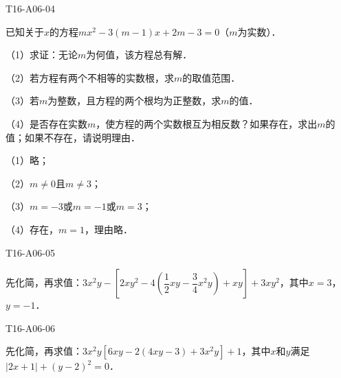 \begin{defproblem}{T16-A06-04}%
\begin{onlyproblem}%
已知关于$x$的方程$mx^{2}-3(m-1)x+2m-3=0$（$m$为实数）．

（1）求证：无论$m$为何值，该方程总有解．

（2）若方程有两个不相等的实数根，求$m$的取值范围．

（3）若$m$为整数，且方程的两个根均为正整数，求$m$的值．

（4）是否存在实数$m$，使方程的两个实数根互为相反数？如果存在，求出$m$的值；如果不存在，请说明理由．
\end{onlyproblem}%
\begin{onlysolution}%
（1）略；

（2）$m\ne 0$且$m\ne 3$；

（3）$m=-3$或$m=-1$或$m=3$；

（4）存在，$m=1$，理由略．
\end{onlysolution}%
\end{defproblem}


\begin{defproblem}{T16-A06-05}%
\begin{onlyproblem}%
先化简，再求值：$3x^2y-\left[2xy^2-4\left(\dfrac{1}{2}xy-\dfrac{3}{4}x^2y\right)+xy\right]+3xy^2$，其中$x=3$，$y=-1$．
\end{onlyproblem}%
\begin{onlysolution}%

\end{onlysolution}%
\end{defproblem}


\begin{defproblem}{T16-A06-06}%
\begin{onlyproblem}%
先化简，再求值：$3x^{2}y[6xy-2(4xy-3)+3x^{2}y]+1$，其中$x$和$y$满足$\vert2x+1\vert+(y-2)^{2}=0$．
\end{onlyproblem}%
\begin{onlysolution}%

\end{onlysolution}%
\end{defproblem}

